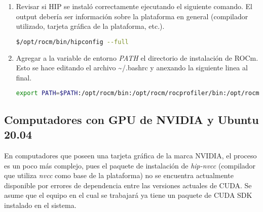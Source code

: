 \begin{enumerate}
\item Revisar si HIP se instaló correctamente ejecutando el siguiente comando. 
El output debería ser información sobre la plataforma en general (compilador utilizado, tarjeta gráfica de la plataforma, etc.).

\begin{lstlisting}[language=bash]
$/opt/rocm/bin/hipconfig --full
\end{lstlisting}

\item Agregar a la variable de entorno \textit{PATH} el directorio de instalación de ROCm. Esto se hace editando el archivo \textasciitilde/.bashrc y anexando la siguiente linea al final.
\begin{lstlisting}[language=bash, breaklines=true]
export PATH=$PATH:/opt/rocm/bin:/opt/rocm/rocprofiler/bin:/opt/rocm/opencl/bin
\end{lstlisting}
\end{enumerate}

\subsection*{Computadores con GPU de NVIDIA y Ubuntu 20.04}

En computadores que poseen una tarjeta gráfica de la marca NVIDIA, el proceso es un poco más complejo, pues el paquete de instalación de \textit{hip-nvcc} (compilador que utiliza \textit{nvcc} como base de la plataforma) no se encuentra actualmente disponible por errores de dependencia entre las versiones actuales de CUDA. Se asume que el equipo en el cual se trabajará ya tiene un paquete de CUDA SDK instalado en el sistema.

